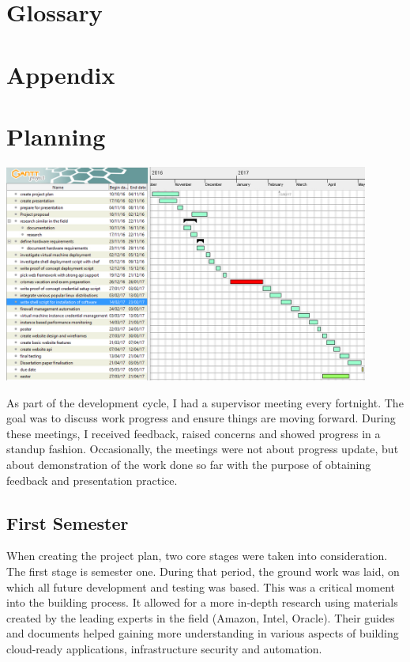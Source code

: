 \documentclass{article}
\begin{document}
\newpage
\section{Glossary}
\printglossary
\newpage
\section{Appendix}

\section{Planning}

\begin{center}
	\includegraphics[width=12cm]{gantt.jpg}
\end{center}

As part of the development cycle, I had a supervisor meeting every fortnight. The goal was to discuss work progress and ensure things are moving forward. During these meetings, I received feedback, raised concerns and showed progress in a \gls{standup} fashion. Occasionally, the meetings were not about progress update, but about demonstration of the work done so far with the purpose of obtaining feedback and presentation practice.

\subsection{First Semester}
When creating the project plan, two core stages were taken into consideration. The first stage is semester one. During that period, the ground work was laid, on which all future development and testing was based. This was a critical moment into the building process. It allowed for a more in-depth research using materials created by the leading experts in the field (Amazon, Intel, Oracle). Their guides and documents helped gaining more understanding in various aspects of building cloud-ready applications, infrastructure security and automation.
\end{document}
